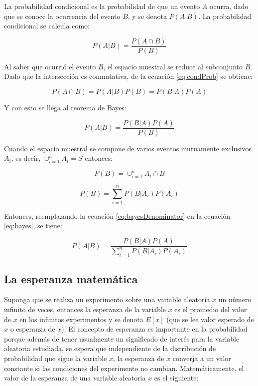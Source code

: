 \documentclass[a4paper, 11pt, oneside]{report}
\begin{document}
La probabilidad condicional es la probabilidad de que un evento $A$ ocurra, dado que se conoce la ocurrencia del evento $B$, y se denota $P(A|B)$. La probabilidad condicional se calcula como:

	\begin{equation}\label{eq:condProb}
		P(A|B) = \frac{P(A \cap B)}{P(B)}
	\end{equation}

Al saber que ocurrió el evento $B$, el espacio muestral se reduce al subconjunto $B$. Dado que la intersección es conmutativa, de la ecuación \ref{eq:condProb} se obtiene:

\[P(A \cap B) = P(A|B)P(B) = P(B|A)P(A)\]

Y con esto se llega al teorema de Bayes:

	\begin{equation}\label{eq:bayes}
		P(A|B) = \frac{P(B|A)P(A)}{P(B)}
	\end{equation}

Cuando el espacio muestral se compone de varios eventos mutuamente exclusivos $A_i$, es decir, $\cup_{i=1}^{n} A_i = S$ entonces:

	\[P(B)=\cup_{i=1}^{n} {A_i \cap B}\]
	
	\begin{equation}\label{eq:bayesDenominator}
		P(B) = \sum_{i=1}^{n}{P(B|A_i)P(A_i)}
	\end{equation}

Entonces, reemplazando la ecuación \ref{eq:bayesDenominator} en la ecuación \ref{eq:bayes}, se tiene:
	
	\begin{equation}\label{eq:bayes2}
		P(A|B) = \frac{P(B|A)P(A)}{\sum_{i=1}^{n}{P(B|A_i)P(A_i)}}
	\end{equation}
	
\subsection{La esperanza matemática}

Suponga que se realiza un experimento sobre una variable aleatoria $x$ un número infinito de veces, entonces la esperanza de la variable $x$ es el promedio del valor de $x$ en los infinitos experimentos y se denota $E[x]$ (que se lee valor esperado de $x$ o esperanza de $x$). El concepto de esperanza es importante en la probabilidad porque además de tener usualmente un significado de interés para la variable aleatoria estudiada, se espera que independiente de la distribución de probabilidad que sigue la variable $x$, la esperanza de $x$ converja a un valor constante si las condiciones del experimento no cambian. Matemáticamente, el valor de la esperanza de una variable aleatoria $x$ es el siguiente:
\end{document}
